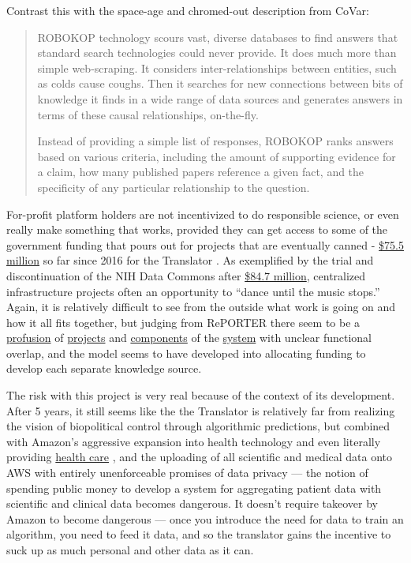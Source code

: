 \documentclass[10pt]{tufte-book}
\begin{document}
Contrast this with the space-age and chromed-out description from CoVar:

\begin{quote}
ROBOKOP technology scours vast, diverse databases to find answers that
standard search technologies could never provide. It does much more than
simple web-scraping. It considers inter-relationships between entities,
such as colds cause coughs. Then it searches for new connections between
bits of knowledge it finds in a wide range of data sources and generates
answers in terms of these causal relationships, on-the-fly.

Instead of providing a simple list of responses, ROBOKOP ranks answers
based on various criteria, including the amount of supporting evidence
for a claim, how many published papers reference a given fact, and the
specificity of any particular relationship to the question.
\end{quote}

For-profit platform holders are not incentivized to do responsible
science, or even really make something that works, provided they can get
access to some of the government funding that pours out for projects
that are eventually canned -
\href{https://reporter.nih.gov/search/kDJ97zGUFEaIBIltUmyd_Q/projects?sort_field=FiscalYear\&sort_order=desc}{\$75.5
million} so far since 2016 for the Translator \citep{RePORTRePORTERBiomedical2021} . As exemplified by the trial and
discontinuation of the NIH Data Commons after
\href{https://reporter.nih.gov/search/H4LxgMGK9kGw6SeWCom85Q/projects?shared=true}{\$84.7
million}, centralized infrastructure projects often an opportunity to
``dance until the music stops.'' Again, it is relatively difficult to
see from the outside what work is going on and how it all fits together,
but judging from RePORTER there seem to be a
\href{https://reporter.nih.gov/project-details/10332268}{profusion} of
\href{https://reporter.nih.gov/project-details/10333468}{projects} and
\href{https://reporter.nih.gov/project-details/10333460}{components} of
the \href{https://reporter.nih.gov/project-details/10330627}{system}
with unclear functional overlap, and the model seems to have developed
into allocating funding to develop each separate knowledge source.

The risk with this project is very real because of the context of its
development. After 5 years, it still seems like the the Translator is
relatively far from realizing the vision of biopolitical control through
algorithmic predictions, but combined with Amazon's aggressive expansion
into health technology \citep{AWSAnnouncesAWS2021}  and even
literally providing \href{https://amazon.care/}{health care} \citep{lermanAmazonBuiltIts2021} , and the uploading of all scientific and
medical data onto AWS with entirely unenforceable promises of data
privacy \citep{quinnYouCanTrust2021}  --- the notion of spending
public money to develop a system for aggregating patient data with
scientific and clinical data becomes dangerous. It doesn't require
takeover by Amazon to become dangerous --- once you introduce the need
for data to train an algorithm, you need to feed it data, and so the
translator gains the incentive to suck up as much personal and other
data as it can.
\end{document}
